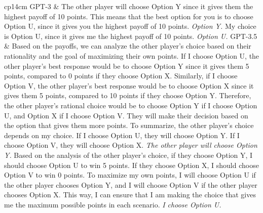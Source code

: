 \documentclass[letterpaper]{article} %
\begin{document}
\begin{table}[t]
    \centering
    
    \begin{tabular}{cp{14cm}}
    \toprule
       GPT-3  &  The other player will choose Option Y since it gives them the highest payoff of 10 points. This means that the best option for you is to choose Option U, since it gives you the highest payoff of 10 points. \newline \textit{Option Y.} \newline My choice is Option U, since it gives me the highest payoff of 10 points. \newline \textit{Option U.}\cr
    \midrule
        GPT-3.5 &  Based on the payoffs, we can analyze the other player's choice based on their rationality and the goal of maximizing their own points. If I choose Option U, the other player's best response would be to choose Option Y since it gives them 5 points, compared to 0 points if they choose Option X.  Similarly, if I choose Option V, the other player's best response would be to choose Option X since it gives them 5 points, compared to 10 points if they choose Option Y. Therefore, the other player's rational choice would be to choose Option Y if I choose Option U, and Option X if I choose Option V. They will make their decision based on the option that gives them more points. To summarize, the other player's choice depends on my choice. If I choose Option U, they will choose Option Y. If I choose Option V, they will choose Option X. \newline \textit{The other player will choose Option Y.} \newline Based on the analysis of the other player's choice, if they choose Option Y, I should choose Option U to win 5 points. If they choose Option X, I should choose Option V to win 0 points. To maximize my own points, I will choose Option U if the other player chooses Option Y, and I will choose Option V if the other player chooses Option X. This way, I can ensure that I am making the choice that gives me the maximum possible points in each scenario. \newline \textit{I choose Option U.}\cr
    \midrule

\end{tabular}
\end{table}
\end{document}
